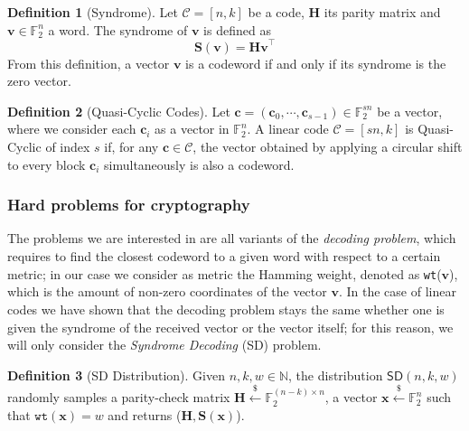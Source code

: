 \documentclass[11pt,a4paper,twocolumn]{article}
\theoremstyle{definition}
\newtheorem{definition}{Definition}[section]
\begin{document}
\begin{definition}[Syndrome]
    Let $\mathcal{C} = [n,k]$ be a code, $\mathbf{H}$ its parity matrix and $\mathbf{v} \in \mathds{F}_2^n$ a word. 
    The syndrome of $\mathbf{v}$ is defined as
    \begin{equation*}
        \mathbf{S}(\mathbf{v}) = \mathbf{Hv}^\top
    \end{equation*}
    From this definition,  a vector $\mathbf{v}$ is a codeword if and only if its syndrome is the zero vector.
\end{definition}

\begin{definition}[Quasi-Cyclic Codes]
    Let $\mathbf{c} = (\mathbf{c}_0, \cdots, \mathbf{c}_{s-1}) \in \mathds{F}_2^{sn}$ be a vector, where we consider 
    each $\mathbf{c}_i$ as a vector in $\mathds{F}_2^n$.
    A linear code $\mathcal{C} = [sn,k]$ is Quasi-Cyclic of index $s$ if, for any $\mathbf{c} \in \mathcal{C}$, 
    the vector obtained by applying a circular shift to every block $\mathbf{c}_i$ simultaneously is also a codeword.
\end{definition}

\subsubsection{Hard problems for cryptography}
The problems we are interested in are all variants of the \textit{decoding problem}, which requires to find 
the closest codeword to a given word with respect to a certain metric; in our case we consider as metric the Hamming
weight, denoted as \texttt{wt}($\mathbf{v}$), which is the amount of non-zero coordinates of the vector $\mathbf{v}$.
In the case of linear codes we have shown that the decoding problem stays the same whether one is given 
the syndrome of the received vector or the vector itself; for this reason, we will only consider 
the \textit{Syndrome Decoding} (\textsf{SD}) problem.\\

\begin{definition}[\textsf{SD} Distribution]
    Given $n,k,w \in \mathds{N}$, the distribution $\textsf{SD}(n, k, w)$ randomly samples a parity-check matrix 
    $\mathbf{H} \xleftarrow{\mathdollar} \mathds{F}_2^{(n-k)\times n}$, a vector 
    $\mathbf{x} \xleftarrow{\mathdollar} \mathds{F}_2^n$ such that $\texttt{wt}(\mathbf{x}) = w$ 
    and returns ($\mathbf{H}, \mathbf{S}(\mathbf{x})$).
\end{definition}
\end{document}
